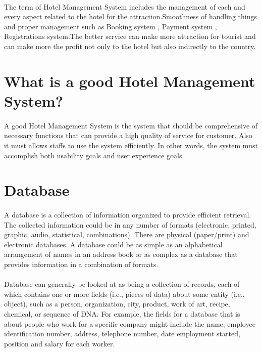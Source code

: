 \paragraph{}
    The term of Hotel Management System includes the management of each and every aspect related to the hotel for the attraction.Smoothness of handling things and proper management such as Booking system , Payment system , Registrations system.The better service can make more attraction for tourist and can make more the profit not only to the hotel but also indirectly to the country.
\section{What is a good Hotel Management System?}
\paragraph{}
     A good Hotel Management System is the system that should be comprehensive of necessary functions that can provide a high quality of service for customer. Also it must allows staffs to use the system efficiently. In other words, the system must accomplish both usability goals and user experience goals.
\section{Database}
\paragraph{}
    A database is a collection of information organized to provide efficient retrieval. The collected information could be in any number of formats (electronic, printed, graphic, audio, statistical, combinations). There are physical (paper/print) and electronic databases.
A database could be as simple as an alphabetical arrangement of names in an address book or as complex as a database that provides information in a combination of formats.
\paragraph{}
   Database can generally be looked at as being a collection of records, each of which contains one or more fields (i.e., pieces of data) about some entity (i.e., object), such as a person, organization, city, product, work of art, recipe, chemical, or sequence of DNA. For example, the fields for a database that is about people who work for a specific company might include the name, employee identification number, address, telephone number, date employment started, position and salary for each worker.
